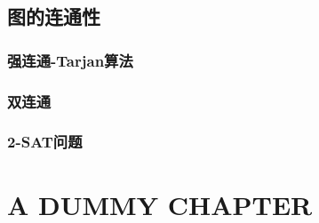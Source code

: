 \documentclass[a4paper]{ctexbook}
\begin{document}
  \section{图的连通性}
  \subsection{强连通-Tarjan算法}
  \subsection{双连通}
  \subsection{2-SAT问题}
  \chapter{A DUMMY CHAPTER}
\end{document}
